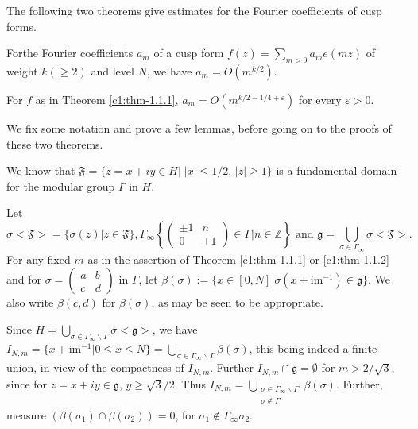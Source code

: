 The following two theorems give estimates for the Fourier coefficients
of cusp forms.

\begin{subtheorem}\label{c1:thm-1.1.1}
For\pageoriginale the Fourier coefficients $a_{m}$ of a cusp form
$f(z)=\sum\limits_{m>0}a_{m}e(mz)$ of weight $k(\geq 2)$ and level
$N$, we have $a_{m}=O(m^{k/2})$.
\end{subtheorem}

\begin{subtheorem}\label{c1:thm-1.1.2}
For $f$ as in Theorem \ref{c1:thm-1.1.1}, $a_{m}=O(m^{k/2-1/4+\varepsilon})$
for every $\varepsilon>0$.
\end{subtheorem}

We fix some notation and prove a few lemmas, before going on to the
proofs of these two theorems.

We know that $\mathfrak{F}=\{z=x+iy\in H| \; |x|\leq 1/2$, $|z|\geq 1\}$
is a fundamental domain for the modular group $\Gamma$ in $H$.

Let
{\fontsize{9}{11}\selectfont
$$
\sigma<\mathfrak{F}>=\{\sigma(z)|z\in\mathfrak{F}\},
\Gamma_{\infty}\left\{
\begin{pmatrix}
\pm 1 & n\\
0 & \pm 1
\end{pmatrix}
\in\Gamma|n\in \mathbb{Z}\right\}\text{ \  and \ }
\mathfrak{g}=\bigcup_{\sigma\in\Gamma_{\infty}}\sigma<\mathfrak{F}>. 
$$}
For any fixed $m$ as in the assertion of Theorem \ref{c1:thm-1.1.1} or
\ref{c1:thm-1.1.2} and for $\sigma=\left(\begin{smallmatrix} a & b\\ c &
  d
\end{smallmatrix}\right)$ in $\Gamma$, let $\beta(\sigma):=\{x\in
    [0,N]|\sigma(x+\text{im}^{-1})\in \mathfrak{g}\}$. We also write
    $\beta(c,d)$ for $\beta(\sigma)$, as may be seen to be
    appropriate.

Since $H=\bigcup\limits_{\sigma\in\Gamma_{\infty}\backslash
  \Gamma}\sigma<\mathfrak{g}>$, we have
$I_{N,m}=\{x+\text{im}^{-1}|0\leq x\leq
N\}=\bigcup\limits_{\sigma\in\Gamma_{\infty}\backslash
  \Gamma}\beta(\sigma)$, this being indeed a finite union, in view of
the compactness of $I_{N,m}$. Further $I_{N,m}\cap \mathfrak{g}=\emptyset$
for $m>2/\sqrt{3}$, since for $z=x+iy\in\mathfrak{g}$, $y\geq
\sqrt{3}/2$. Thus $I_{N,m}=\bigcup\limits_{\substack{\sigma\in
    \Gamma_{\infty}\backslash \Gamma\\ \sigma\not\in
    \Gamma}}\beta(\sigma)$. Further, measure $(\beta(\sigma_{1})\cap
\beta(\sigma_{2}))=0$, for $\sigma_{1}\not\in
\Gamma_{\infty}\sigma_{2}$.

